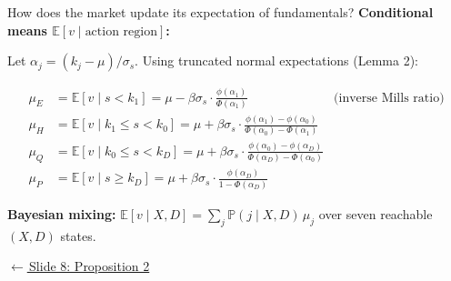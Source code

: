 \documentclass[aspectratio=169,10pt]{beamer}
\newcommand{\E}{\mathbb{E}}
\newcommand{\PP}{\mathbb{P}}
\newcommand{\1}{\mathbf{1}}
\newcommand{\returnlink}[2]{%
  \par\vspace{0.2em}\hfill{\scriptsize\hyperlink{#1}{\textcolor{brightblue}{$\leftarrow$\,#2}}}%
}
\begin{document}
\begin{frame}{How does the market update its expectation of fundamentals?}
\hypertarget{backup:cond_means}{}
\scriptsize
\textbf{Conditional means $\E[v \mid \text{action region}]$:}

\vspace{0.2em}

Let $\alpha_j = (k_j - \mu)/\sigma_s$. Using truncated normal expectations (Lemma 2):

\vspace{0.2em}

\begin{align*}
\mu_E &= \E[v \mid s < k_1] = \mu - \beta\sigma_s \cdot \frac{\phi(\alpha_1)}{\Phi(\alpha_1)} &\text{(inverse Mills ratio)}\\[0.3em]
\mu_H &= \E[v \mid k_1 \le s < k_0] = \mu + \beta\sigma_s \cdot \frac{\phi(\alpha_1) - \phi(\alpha_0)}{\Phi(\alpha_0) - \Phi(\alpha_1)}\\[0.3em]
\mu_Q &= \E[v \mid k_0 \le s < k_D] = \mu + \beta\sigma_s \cdot \frac{\phi(\alpha_0) - \phi(\alpha_D)}{\Phi(\alpha_D) - \Phi(\alpha_0)}\\[0.3em]
\mu_P &= \E[v \mid s \ge k_D] = \mu + \beta\sigma_s \cdot \frac{\phi(\alpha_D)}{1 - \Phi(\alpha_D)}
\end{align*}

\vspace{0.2em}

\textbf{Bayesian mixing:} $\E[v \mid X, D] = \sum_{j} \PP(j \mid X, D)\,\mu_j$ over seven reachable $(X,D)$ states.

\returnlink{main:prop2}{Slide 8: Proposition 2}
\end{frame}
\end{document}
